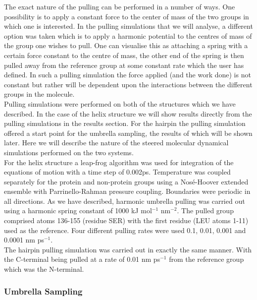 \documentclass[12pt, onecolumn]{revtex4}    %
\begin{document}
The exact nature of the pulling can be performed in a number of ways.  One possibility is to apply a constant force to the center of mass of the two groups in which one is interested\cite{GMX}.  In the pulling simulations that we will analyse, a different option was taken which is to apply a harmonic potential to the centres of mass of the group one wishes to pull\cite{GMX}.  One can visualise this as attaching a spring with a certain force constant to the centre of mass, the other end of the spring is then pulled away from the reference group at some constant rate which the user has defined.  In such a pulling simulation the force applied (and the work done) is not constant but rather will be dependent upon the interactions between the different groups in the molecule\cite{GMX}.\\

Pulling simulations were performed on both of the structures which we have described.  In the case of the helix structure we will show results directly from the pulling simulations in the results section.  For the hairpin the pulling simulation offered a start point for the umbrella sampling, the results of which will be shown later.  Here we will describe the nature of the steered molecular dynamical simulations performed on the two systems.\\

For the helix structure a leap-frog algorithm \cite{GMX} was used for integration of the equations of motion with a time step of 0.002ps.  Temperature was coupled separately for the protein and non-protein groups using a Nos\' e-Hoover \cite{NH} extended ensemble with Parrinello-Rahman \cite{PR} pressure coupling.  Boundaries were periodic in all directions.  As we have described, harmonic umbrella pulling was carried out using a harmonic spring constant of 1000 kJ mol$^{-1}$ nm$^{-2}$.  The pulled group comprised atoms 136-155 (residue SER) with the first residue (LEU atoms 1-11) used as the reference.  Four different pulling rates were used 0.1, 0.01, 0.001 and 0.0001 nm ps$^{-1}$.\\  

The hairpin pulling simulation was carried out in exactly the same manner.  With the C-terminal being pulled at a rate of 0.01 nm ps$^{-1}$ from the reference group which was the N-terminal.


\subsubsection{Umbrella Sampling}
\end{document}
